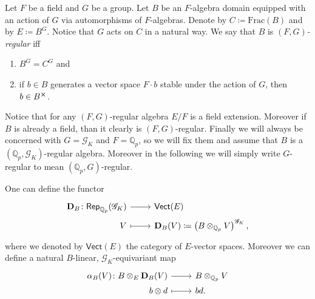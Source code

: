 

\begin{defn}
	Let $F$ be a field and $G$ be a group.
	Let $B$ be an $F$-algebra domain
	equipped with an action of $G$ via automorphisms of $F$-algebras.
	Denote by $C \coloneqq \mathrm{Frac}(B)$ and by $E \coloneqq B^{G}$.
	Notice that $G$ acts on $C$ in a natural way.
	We say that $B$ is {\em $(F,G)$-regular} iff
\begin{enumerate}
	\item $B^{G} = C^{G}$ and
	\item if $b \in B$ generates a vector space $F \cdot b$
		stable under the action of $G$, then $b \in B^{\cross}$.
\end{enumerate}
\end{defn}


\begin{rem}[]
	Notice that for any $(F,G)$-regular algebra $E/F$ is a field extension.
	Moreover if $B$ is already a field, than it clearly is $(F,G)$-regular.
	Finally we will always be concerned with $G = \mathscr{G}_K$ and $F = \mathbb{Q}_p$,
	so we will fix them and assume that $B$ is a $(\mathbb{Q}_p, \mathscr{G}_K)$-regular
	algebra.
	Moreover in the following we will simply write 
	$G$-regular to mean $(\mathbb{Q}_p, G)$-regular.
\end{rem}


\begin{defn}[]
	One can define the functor
	\begin{equation*}
	\begin{tikzcd}[row sep = 0ex
		,/tikz/column 1/.append style={anchor=base east}
		,/tikz/column 2/.append style={anchor=base west}]
		\mathbf{D}_B\colon \mathsf{Rep}_{\mathbb{Q}_p}(\mathscr{G}_K) \arrow[r, "", rightarrow] &
		\mathsf{Vect}(E) \\
		V \arrow[r, "", mapsto] & 
		\mathbf{D}_B(V) \coloneqq \left( B \otimes_{\mathbb{Q}_p} V \right)^{\mathscr{G}_K}
	,\end{tikzcd}
	\end{equation*} 
	where we denoted by $\mathsf{Vect}(E)$ the category of $E$-vector spaces.
	Moreover we can define a natural $B$-linear, $\mathscr{G}_K$-equivariant map
	\begin{equation*}
	\begin{tikzcd}[row sep = 0ex
		,/tikz/column 1/.append style={anchor=base east}
		,/tikz/column 2/.append style={anchor=base west}]
		\alpha_B(V)\colon 
		B \otimes_E \mathbf{D}_B(V) \arrow[r, "", rightarrow] &
		B \otimes_{\mathbb{Q}_p} V \\
		b \otimes d
		\arrow[r, "", mapsto] & 
		bd
	.\end{tikzcd}
	\end{equation*}
\end{defn}


